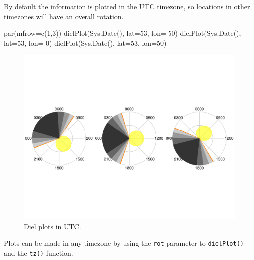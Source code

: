 \documentclass[
]{book}
\newenvironment{Shaded}{\begin{snugshade}}{\end{snugshade}}
\newcommand{\AttributeTok}[1]{\textcolor[rgb]{0.77,0.63,0.00}{#1}}
\newcommand{\DecValTok}[1]{\textcolor[rgb]{0.00,0.00,0.81}{#1}}
\newcommand{\FunctionTok}[1]{\textcolor[rgb]{0.00,0.00,0.00}{#1}}
\newcommand{\NormalTok}[1]{#1}
\newcommand{\SpecialCharTok}[1]{\textcolor[rgb]{0.00,0.00,0.00}{#1}}
\begin{document}
By default the information is plotted in the UTC timezone, so locations in other timezones will have an overall rotation.

\begin{Shaded}
\begin{Highlighting}[]
\FunctionTok{par}\NormalTok{(}\AttributeTok{mfrow=}\FunctionTok{c}\NormalTok{(}\DecValTok{1}\NormalTok{,}\DecValTok{3}\NormalTok{))}
\FunctionTok{dielPlot}\NormalTok{(}\FunctionTok{Sys.Date}\NormalTok{(), }\AttributeTok{lat=}\DecValTok{53}\NormalTok{, }\AttributeTok{lon=}\SpecialCharTok{{-}}\DecValTok{50}\NormalTok{)}
\FunctionTok{dielPlot}\NormalTok{(}\FunctionTok{Sys.Date}\NormalTok{(), }\AttributeTok{lat=}\DecValTok{53}\NormalTok{, }\AttributeTok{lon=}\SpecialCharTok{{-}}\DecValTok{0}\NormalTok{)}
\FunctionTok{dielPlot}\NormalTok{(}\FunctionTok{Sys.Date}\NormalTok{(), }\AttributeTok{lat=}\DecValTok{53}\NormalTok{, }\AttributeTok{lon=}\DecValTok{50}\NormalTok{)}
\end{Highlighting}
\end{Shaded}

\begin{figure}

{\centering \includegraphics[width=0.9\linewidth]{_main_files/figure-latex/diel-plot-no-tz-1} 

}

\caption{Diel plots in UTC.}\label{fig:diel-plot-no-tz}
\end{figure}

Plots can be made in any timezone by using the \texttt{rot} parameter to \texttt{dielPlot()} and the \texttt{tz()} function.
\end{document}
